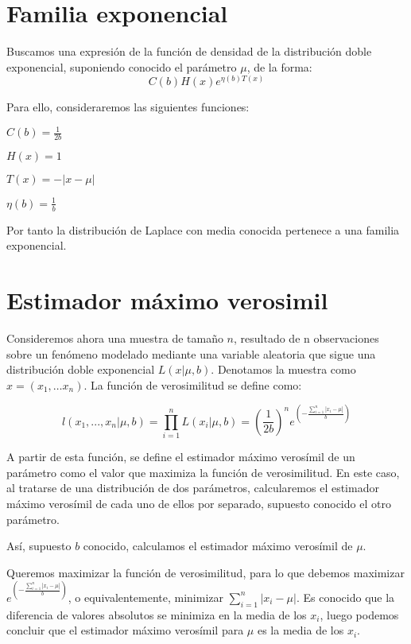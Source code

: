\documentclass[a4paper, 10pt]{article} %
\begin{document}
\section{Familia exponencial}

Buscamos una expresión de la función de densidad de la distribución doble exponencial, suponiendo conocido el parámetro $\mu$, de la forma: $$C\left(b\right)H(x)e^{\eta(b)T(x)}$$

Para ello, consideraremos las siguientes funciones: 
\begin{description}
\item$C\left(b\right) = \frac{1}{2b} $
\item$H(x) = 1$
\item$T(x) = -|x-\mu|$
\item$\eta(b) = \frac{1}{b}$
\end{description}

Por tanto la distribución de Laplace con media conocida pertenece a una familia exponencial. 

\section{Estimador máximo verosimil}

Consideremos ahora una muestra de tamaño $n$, resultado de n observaciones sobre un fenómeno modelado
mediante una variable aleatoria que sigue una distribución doble exponencial $L(x|\mu, b)$. Denotamos
la muestra como $x = \left(x_1, \dots x_n\right)$. La función de verosimilitud se define como:

$$l(x_1,...,x_n|\mu, b)=\prod_{i=1}^{n} L(x_i|\mu, b) = \left(\frac{1}{2b}\right)^n 
e^{\left(-\frac{\sum_{i=1}^{n}|x_i-\mu|}{b}\right)}$$

A partir de esta función, se define el estimador máximo verosímil de un parámetro como el valor que
maximiza la función de verosimilitud. En este caso, al tratarse de una distribución de dos parámetros,
calcularemos el estimador máximo verosímil de cada uno de ellos por separado, supuesto conocido el otro parámetro. 

Así, supuesto $b$ conocido, calculamos el estimador máximo verosímil de $\mu$. 

Queremos maximizar la función de verosimilitud, para lo que debemos maximizar $e^{\left(-\frac{\sum_{i=1}^{n}|x_i-\mu|}{b}\right)}$,
o equivalentemente, minimizar $\sum_{i=1}^{n}|x_i-\mu|$. Es conocido que la diferencia de valores absolutos se minimiza
en la media de los $x_i$, luego podemos concluir que el estimador máximo verosímil para $\mu$ es la media de los $x_i$. 
\end{document}
